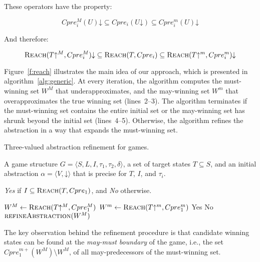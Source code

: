 \documentclass[a4paper,twoside,openright,11pt]{book}
\newcommand{\reach}[0]{\textsc{Reach}}
\newcommand{\concrete}[1]{#1\mathord{\downarrow}}
\newcommand{\abstractm}[1]{#1\mathord{\uparrow^m}}
\newcommand{\abstractM}[1]{#1\mathord{\uparrow^M}}
\theoremstyle{definition}
\begin{document}
These operators have the property:

\begin{equation}
\concrete{Cpre_i^M(U)} \subseteq Cpre_i(\concrete{U}) \subseteq \concrete{Cpre_i^m(U)}
\end{equation}

And therefore:

\begin{equation}
\concrete{\reach(\abstractM{T}, Cpre_i^M)} \subseteq \reach(T, Cpre_i) \subseteq \concrete{\reach(\abstractm{T}, Cpre_i^m)}
\end{equation}

Figure~\ref{f:reach} illustrates the main idea of our approach, which is presented in algorithm~\ref{alg:generic}.  At every iteration, the algorithm computes the must-winning set $W^M$ that underapproximates, and the may-winning set $W^m$ that overapproximates the true winning set (lines~2--3).  The algorithm terminates if the must-winning set contains the entire initial set or the may-winning set has shrunk beyond the initial set (lines~4--5).  Otherwise, the algorithm refines the abstraction in a way that expands the must-winning set.

\begin{algorithm}
\caption{Three-valued abstraction refinement for games.}
\label{alg:generic}

\begin{algorithmic}[1]

     A game structure $G = \langle S, L, I, \tau_1, \tau_2, \delta \rangle$, a set 
    of target states $T\subseteq S$, and an initial abstraction $\alpha=\langle V, \concrete{} \rangle$
    that is precise for $T$, $I$, and $\tau_i$.

     {\it Yes} if $I \subseteq \reach(T, Cpre_1)$, and {\it No} otherwise.

    \Loop
        \State $W^M \gets \reach(\abstractM{T}, Cpre_1^M)$
        \State $W^m \gets \reach(\abstractm{T}, Cpre_1^m)$
        \If{$\abstractM{I} \subseteq W^M$} 
            \State\Return Yes
        \ElsIf{$\abstractM{I} \nsubseteq W^m$} 
            \State\Return No
        \Else       
            \State$\Call{refineAbstraction}{W^M}$
        \EndIf
    \EndLoop
\end{algorithmic}
\end{algorithm}

The key observation behind the refinement procedure is that candidate winning states can be found at the \emph{may-must boundary} of the game, i.e., the set $Cpre_1^{m+}(W^M)\setminus W^M$, of all may-predecessors of the must-winning set. 
\end{document}
